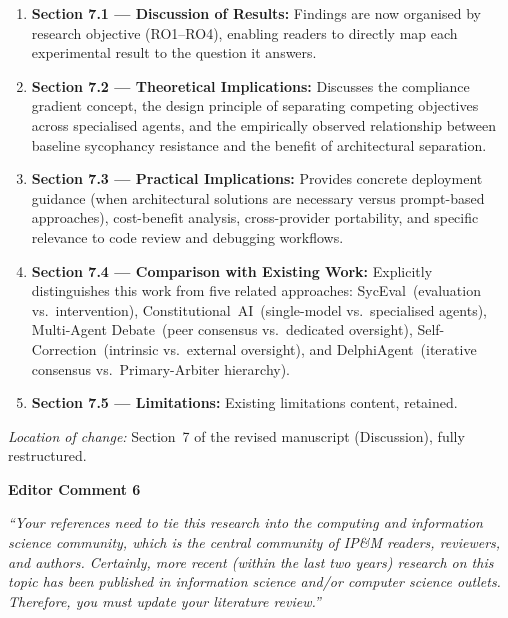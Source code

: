 \documentclass[12pt,a4paper]{article}
\begin{document}
\begin{enumerate}[nosep]
  \item \textbf{Section 7.1 --- Discussion of Results:} Findings are now organised by research objective (RO1--RO4), enabling readers to directly map each experimental result to the question it answers.
  \item \textbf{Section 7.2 --- Theoretical Implications:} Discusses the compliance gradient concept, the design principle of separating competing objectives across specialised agents, and the empirically observed relationship between baseline sycophancy resistance and the benefit of architectural separation.
  \item \textbf{Section 7.3 --- Practical Implications:} Provides concrete deployment guidance (when architectural solutions are necessary versus prompt-based approaches), cost-benefit analysis, cross-provider portability, and specific relevance to code review and debugging workflows.
  \item \textbf{Section 7.4 --- Comparison with Existing Work:} Explicitly distinguishes this work from five related approaches: SycEval~(evaluation vs.\ intervention), Constitutional~AI~(single-model vs.\ specialised agents), Multi-Agent Debate~(peer consensus vs.\ dedicated oversight), Self-Correction~(intrinsic vs.\ external oversight), and DelphiAgent~(iterative consensus vs.\ Primary-Arbiter hierarchy).
  \item \textbf{Section 7.5 --- Limitations:} Existing limitations content, retained.
\end{enumerate}

\textit{Location of change:} Section~7 of the revised manuscript (Discussion), fully restructured.

\vspace{0.5cm}


\noindent \textbf{Editor Comment 6}

\begin{editorbox}
\textit{``Your references need to tie this research into the computing and information science community, which is the central community of IP\&M readers, reviewers, and authors. Certainly, more recent (within the last two years) research on this topic has been published in information science and/or computer science outlets. Therefore, you must update your literature review.''}
\end{editorbox}
\end{document}
